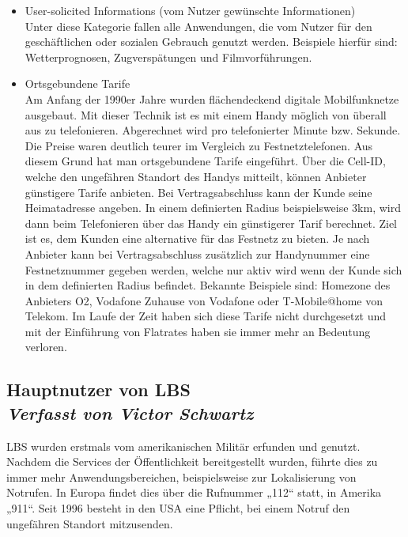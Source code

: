 \begin{itemize}
	\item User-solicited Informations (vom Nutzer gewünschte Informationen)\\
Unter diese Kategorie fallen alle Anwendungen, die vom Nutzer für den geschäftlichen oder sozialen Gebrauch genutzt werden. Beispiele hierfür sind: Wetterprognosen, Zugverspätungen und Filmvorführungen.
	\item Ortsgebundene Tarife\\
	Am Anfang der 1990er Jahre wurden flächendeckend digitale Mobilfunknetze ausgebaut. Mit dieser Technik ist es mit einem Handy möglich von überall aus zu telefonieren. Abgerechnet wird pro telefonierter Minute bzw. Sekunde. Die Preise waren deutlich teurer im Vergleich zu Festnetztelefonen. Aus diesem Grund hat man ortsgebundene Tarife eingeführt. Über die Cell-ID, welche den ungefähren Standort des Handys mitteilt, können Anbieter günstigere Tarife anbieten. Bei Vertragsabschluss kann der Kunde seine Heimatadresse angeben. In einem definierten Radius beispielsweise 3km, wird dann beim Telefonieren über das Handy ein günstigerer Tarif berechnet. Ziel ist es, dem Kunden eine alternative für das Festnetz zu bieten. Je nach Anbieter kann bei Vertragsabschluss zusätzlich zur Handynummer eine Festnetznummer gegeben werden, welche nur aktiv wird wenn der Kunde sich in dem definierten Radius befindet. Bekannte Beispiele sind: Homezone des Anbieters O2, Vodafone Zuhause von Vodafone oder T-Mobile@home von Telekom. Im Laufe der Zeit haben sich diese Tarife nicht durchgesetzt und mit der Einführung von Flatrates haben sie immer mehr an Bedeutung verloren. \cite{OrtgTarife} 
\end{itemize}


\subsection[Hauptnutzer von LBS]{Hauptnutzer von LBS
 \\ \textnormal{\small{\textit {Verfasst von Victor Schwartz}}}}

LBS wurden erstmals vom amerikanischen Militär erfunden und genutzt. Nachdem die Services der Öffentlichkeit bereitgestellt wurden, führte dies zu immer mehr Anwendungsbereichen, beispielsweise zur Lokalisierung von Notrufen. In Europa findet dies über die Rufnummer „112“ statt, in Amerika „911“.  Seit 1996 besteht in den USA eine Pflicht, bei einem Notruf den ungefähren Standort mitzusenden. 

